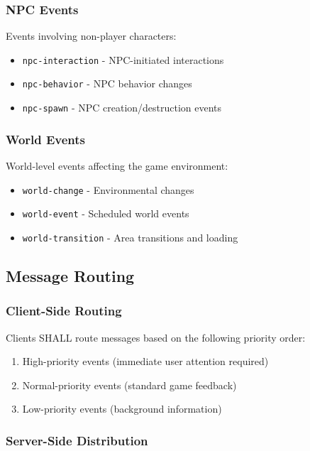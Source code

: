 \documentclass[12pt,a4paper]{article}
\begin{document}
\subsubsection{NPC Events}

Events involving non-player characters:

\begin{itemize}
\item \texttt{npc-interaction} - NPC-initiated interactions
\item \texttt{npc-behavior} - NPC behavior changes
\item \texttt{npc-spawn} - NPC creation/destruction events
\end{itemize}

\subsubsection{World Events}

World-level events affecting the game environment:

\begin{itemize}
\item \texttt{world-change} - Environmental changes
\item \texttt{world-event} - Scheduled world events
\item \texttt{world-transition} - Area transitions and loading
\end{itemize}

\subsection{Message Routing}

\subsubsection{Client-Side Routing}

Clients SHALL route messages based on the following priority order:

\begin{enumerate}
\item High-priority events (immediate user attention required)
\item Normal-priority events (standard game feedback)
\item Low-priority events (background information)
\end{enumerate}

\subsubsection{Server-Side Distribution}
\end{document}
